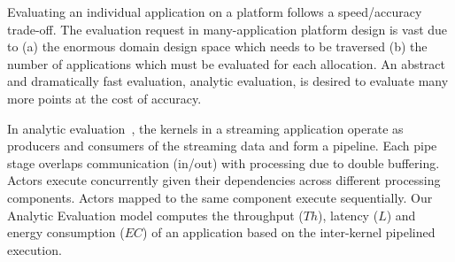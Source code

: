 Evaluating an individual application on a platform follows a speed/accuracy trade-off.
The evaluation request in many-application platform design is vast due to (a) the enormous domain design space which needs to be traversed (b) the number of applications which must be evaluated for each allocation. 
An abstract and dramatically fast evaluation, analytic evaluation, is desired to evaluate many more points at the cost of accuracy.


In analytic evaluation~\cite{Teimouri_TCAD_2018}, the kernels in a streaming application operate as producers and consumers of the streaming data and form a pipeline. 
Each pipe stage overlaps communication (in/out) with processing due to double buffering. Actors execute concurrently given their dependencies across different processing components. Actors mapped to the same component execute sequentially.
Our Analytic Evaluation model computes the throughput ($Th$), latency ($L$) and energy consumption ($EC$) of an application based on the inter-kernel pipelined execution.

